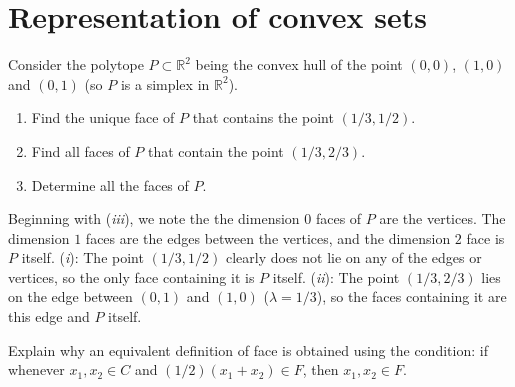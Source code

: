 \section{Representation of convex sets}

\begin{exercise}
  Consider the polytope $P \subset \mathbb{R}^2$ being the convex hull of the point $(0, 0)$, $(1, 0)$ and $(0, 1)$ (so $P$ is a simplex in $\mathbb{R}^2$).
  \begin{enumerate}[label = (\emph{\roman*})]
    \item Find the unique face of $P$ that contains the point $(1/3, 1/2)$.
    \item Find all faces of $P$ that contain the point $(1/3, 2/3)$.
    \item Determine all the faces of $P$.
  \end{enumerate}
\end{exercise}

\begin{solution}
  Beginning with (\emph{iii}), we note the the dimension $0$ faces of $P$ are the vertices.
  The dimension $1$ faces are the edges between the vertices, and the dimension $2$ face is $P$ itself.
  (\emph{i}): The point $(1/3, 1/2)$ clearly does not lie on any of the edges or vertices, so the only face containing it is $P$ itself.
  (\emph{ii}): The point $(1/3, 2/3)$ lies on the edge between $(0, 1)$ and $(1, 0)$ ($\lambda = 1/3$), so the faces containing it are this edge and $P$ itself.
\end{solution}

\begin{exercise}
  Explain why an equivalent definition of face is obtained using the condition: if whenever $x_1, x_2 \in C$ and $(1/2)(x_1 + x_2) \in F$, then $x_1, x_2 \in F$.
\end{exercise}

